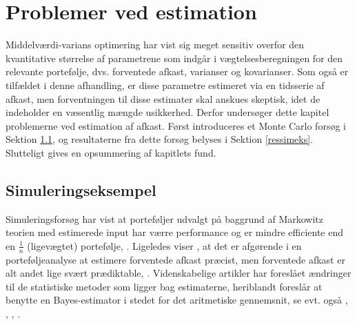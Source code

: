 \documentclass[
  a4paper,
  oneside]{memoir}
\begin{document}
\hypertarget{problemervedest}{%
\chapter{Problemer ved estimation}\label{problemervedest}}

Middelværdi-varians optimering har vist sig meget sensitiv overfor den kvantitative størrelse af parametrene som indgår i vægtelsesberegningen for den relevante portefølje, dvs. forventede afkast, varianser og kovarianser. Som også er tilfældet i denne afhandling, er disse parametre estimeret via en tidsserie af afkast, men forventningen til disse estimater skal anskues skeptisk, idet de indeholder en væsentlig mængde usikkerhed. Derfor undersøger dette kapitel problemerne ved estimation af afkast. Først introduceres et Monte Carlo forsøg i Sektion \ref{simeks}, og resultaterne fra dette forsøg belyses i Sektion \ref{ressimeks}. Slutteligt gives en opsummering af kapitlets fund.

\hypertarget{simeks}{%
\section{Simuleringseksempel}\label{simeks}}

Simuleringsforsøg har vist at porteføljer udvalgt på baggrund af Markowitz teorien med estimerede input har værre performance og er mindre efficiente end en \(\tfrac{1}{n}\) (ligevægtet) portefølje, \citep{Frankfurter1971}. Ligeledes viser \citep{Chopra1993}, at det er afgørende i en porteføljeanalyse at estimere forventede afkast præcist, men forventede afkast er alt andet lige svært prædiktable, \citep{Merton1980}. Videnskabelige artikler har foreslået ændringer til de statistiske metoder som ligger bag estimaterne, heriblandt foreslår \citep{Jorion1986} at benytte en Bayes-estimator i stedet for det aritmetiske gennemsnit, se evt. også \citep{MacKinlay2000}, \citep{Garlappi2007}, \citep{Kan2007}, \citep{Tu2011}.
\end{document}
